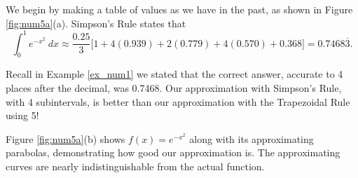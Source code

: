 {We begin by making a table of values as we have in the past, as shown in Figure \ref{fig:num5a}(a).
Simpson's Rule states that $$\int_0^1e^{-x^2}\ dx \approx \frac{0.25}{3}\Big[1+4(0.939)+2(0.779)+4(0.570) + 0.368\Big] = 0.7468\overline{3}.$$

Recall in Example \ref{ex_num1} we stated that the correct answer, accurate to 4 places after the decimal, was 0.7468. Our approximation with Simpson's Rule, with 4 subintervals, is better than our approximation with the Trapezoidal Rule using 5!


Figure \ref{fig:num5a}(b) shows $f(x) = e^{-x^2}$ along with its approximating parabolas, demonstrating how good our approximation is. The approximating curves are nearly indistinguishable from the actual function.
}\\

